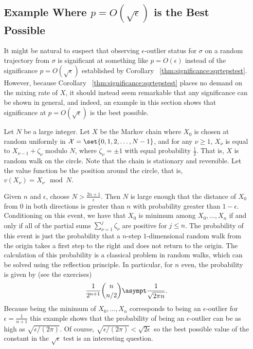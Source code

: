 \documentclass[12pt]{article}
\begin{document}
\subsection*{Example Where \( p = O(\sqrt{\epsilon}) \) is the Best
Possible}

It might be natural to suspect that observing \( \epsilon \)-outlier
status for \( \sigma \) on a random trajectory from \( \sigma \) is
significant at something like \( p = O(\epsilon) \) instead of the
significance \( p = O(\sqrt{\epsilon}) \) established by Corollary~%
\ref{thm:significance:sqrtepstest}.  However, because Corollary~%
\ref{thm:significance:sqrtepstest} places no demand on the mixing rate
of \( X \), it should instead seem remarkable that any significance can
be shown in general, and indeed, an example in this section shows that
significance at \( p = O( \sqrt{\epsilon}) \) is the best possible.

Let \( N \) be a large integer.  Let \( X \) be the Markov chain where \(
X_0 \) is chosen at random uniformly in \( \mathcal{X} = \set{0, 1, 2, \dots , N-1} \),
and for any \( \nu \ge 1 \), \( X_{\nu} \) is equal to \( X_{\nu-1} +
\zeta_{\nu} \) modulo \( N \), where \( \zeta_{\nu} = \pm 1 \) with
equal probability \( \frac{1}{2} \).  That is, \( X \) is random walk on
the circle.  Note that the chain is stationary and reversible.  Let the
value function be the position around the circle, that is, \(
v(X_{\nu}) = X_{\nu} \mod N \).

Given \( n \) and \( \epsilon \), choose \( N > \frac{2n+1}{\epsilon} \).
Then \( N \) is large enough that the distance of \( X_0 \) from \( 0 \)
in both directions is greater than \( n \) with probability greater
than \( 1 -
\epsilon \). Conditioning on this event, we have that \( X_0 \) is
minimum among \( X_0, \dots , X_n \) if and only if all of the partial
sums \( \sum\limits_{\nu=1}^ {j} \zeta_\nu \) are positive for \( j \le
n \).  The probability of this event is just the probability that a \( n
\)-step \( 1 \)-dimensional random walk from the origin takes a first
step to the right and does not return to the origin.  The calculation of
this probability is a classical problem in random walks, which can be
solved using the reflection principle.  In particular, for \( n \) even,
the probability is given by (see the exercises) 
\[
    \frac{1}{2^{n+1}}\binom{n}{n/2} \asympt \frac{1}{\sqrt{2 \pi n}}.
\] Because being the minimum of \( X_0, \dots , X_n \) corresponds to
being an \( \epsilon \)-outlier for \( \epsilon = \frac{1}{n+1} \) this
example shows that the probability of being an \( \epsilon \)-outlier
can be as high as \( \sqrt{\epsilon/(2\pi)} \).  Of course, \( \sqrt{\epsilon/
(2\pi)} < \sqrt{2\epsilon} \) so the best possible value of the constant
in the \( \sqrt{\epsilon} \) test is an interesting question.
\end{document}
